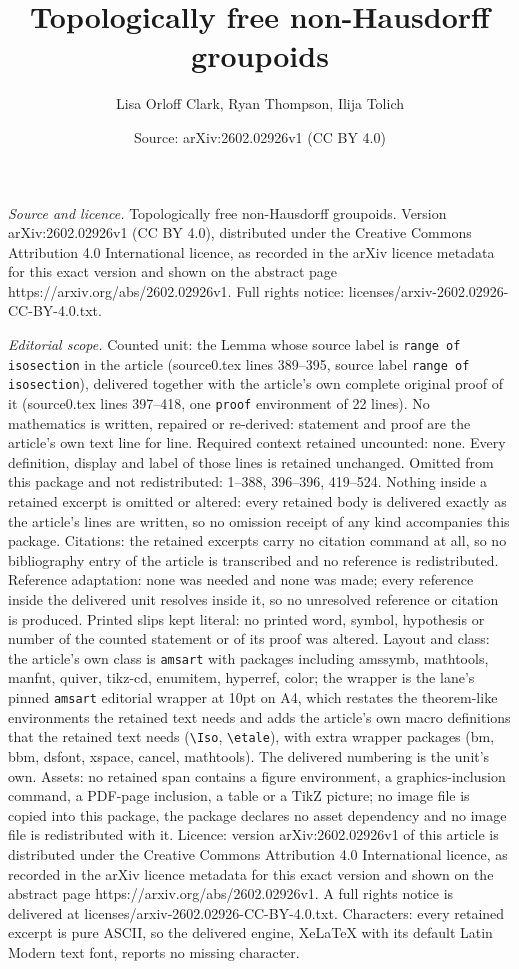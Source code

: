 \documentclass[10pt,a4paper]{amsart}
\title[Topologically free non-Hausdorff groupoids]{Topologically free non-Hausdorff groupoids}
\author{Lisa Orloff Clark, Ryan Thompson, Ilija Tolich}
\date{Source: arXiv:2602.02926v1 (CC BY 4.0)}
\begin{document}
\maketitle

\noindent\emph{Source and licence.} Topologically free non-Hausdorff groupoids. Version arXiv:2602.02926v1 (CC BY 4.0), distributed under the Creative Commons Attribution 4.0 International licence, as recorded in the arXiv licence metadata for this exact version and shown on the abstract page https://arxiv.org/abs/2602.02926v1. Full rights notice: licenses/arxiv-2602.02926-CC-BY-4.0.txt.\par\smallskip

\noindent\textit{Editorial scope.} Counted unit: the Lemma whose source label is \texttt{range of isosection} in the article (source0.tex lines 389--395, source label \texttt{range of isosection}), delivered together with the article's own complete original proof of it (source0.tex lines 397--418, one \texttt{proof} environment of 22 lines). No mathematics is written, repaired or re-derived: statement and proof are the article's own text line for line. Required context retained uncounted: none. Every definition, display and label of those lines is retained unchanged. Omitted from this package and not redistributed: 1--388, 396--396, 419--524. Nothing inside a retained excerpt is omitted or altered: every retained body is delivered exactly as the article's lines are written, so no omission receipt of any kind accompanies this package. Citations: the retained excerpts carry no citation command at all, so no bibliography entry of the article is transcribed and no reference is redistributed. Reference adaptation: none was needed and none was made; every reference inside the delivered unit resolves inside it, so no unresolved reference or citation is produced. Printed slips kept literal: no printed word, symbol, hypothesis or number of the counted statement or of its proof was altered. Layout and class: the article's own class is \texttt{amsart} with packages including amssymb, mathtools, manfnt, quiver, tikz-cd, enumitem, hyperref, color; the wrapper is the lane's pinned \texttt{amsart} editorial wrapper at 10pt on A4, which restates the theorem-like environments the retained text needs and adds the article's own macro definitions that the retained text needs (\texttt{\textbackslash Iso}, \texttt{\textbackslash etale}), with extra wrapper packages (bm, bbm, dsfont, xspace, cancel, mathtools). The delivered numbering is the unit's own. Assets: no retained span contains a figure environment, a graphics-inclusion command, a PDF-page inclusion, a table or a TikZ picture; no image file is copied into this package, the package declares no asset dependency and no image file is redistributed with it. Licence: version arXiv:2602.02926v1 of this article is distributed under the Creative Commons Attribution 4.0 International licence, as recorded in the arXiv licence metadata for this exact version and shown on the abstract page https://arxiv.org/abs/2602.02926v1. A full rights notice is delivered at licenses/arxiv-2602.02926-CC-BY-4.0.txt. Characters: every retained excerpt is pure ASCII, so the delivered engine, XeLaTeX with its default Latin Modern text font, reports no missing character.
\end{document}
